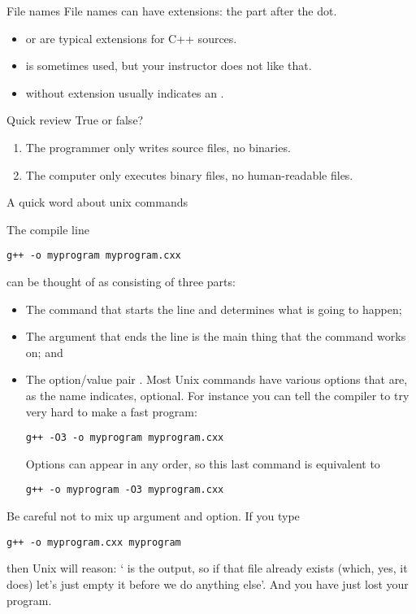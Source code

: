 

\begin{block}{File names}
  \label{sl:file-ext}
  File names can have extensions: the part after the dot.
  \begin{itemize}
  \item {} or  are typical extensions for
    C++ sources.
  \item {} is sometimes used, but your instructor does
    not like that.
  \item {} without extension usually indicates an .
  \end{itemize}
\end{block}

\begin{exercise}{Quick review}
  \label{q:compiler}
  True or false?
  \begin{enumerate}
  \item The programmer only writes source files, no binaries.
  \item The computer only executes binary files, no human-readable files.
  \end{enumerate}
\end{exercise}

 {A quick word about unix commands}

The compile line
\begin{verbatim}
g++ -o myprogram myprogram.cxx
\end{verbatim}
can be thought of as consisting of three parts:
\begin{itemize}
\item The command  that starts the line and determines what is
  going to happen;
\item The argument  that ends the line is the main
  thing that the command works on; and
\item The option/value pair . Most Unix commands have
  various options that are, as the name indicates, optional. For
  instance you can tell the compiler to try very hard to make a fast program:
\begin{verbatim}
g++ -O3 -o myprogram myprogram.cxx
\end{verbatim}
  Options can appear in any order, so this last command is equivalent to
\begin{verbatim}
g++ -o myprogram -O3 myprogram.cxx
\end{verbatim}
\end{itemize}
Be careful not to mix up argument and option. If you type
\begin{verbatim}
g++ -o myprogram.cxx myprogram
\end{verbatim}
then Unix will reason: ` is the output, so if that
file already exists (which, yes, it does) let's just empty it before
we do anything else'. And you have just lost your program.

